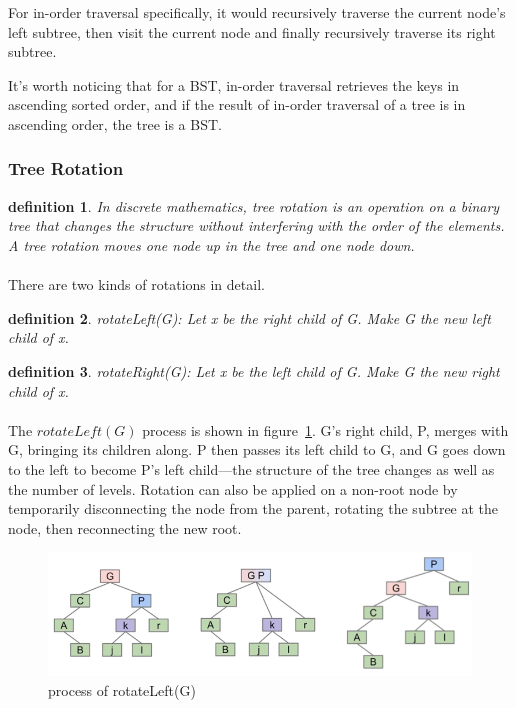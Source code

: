 \documentclass{article}
\newtheorem{definition}{definition}[section]
\begin{document}
For in-order traversal specifically, it would recursively traverse the current node's left subtree, then visit the current node and finally recursively traverse its right subtree.

It's worth noticing that for a BST, in-order traversal retrieves the keys in ascending sorted order, and if the result of in-order traversal of a tree is in ascending order, the tree is a BST.

\subsubsection{Tree Rotation}\label{rotation}

\begin{definition}
    In discrete mathematics, tree rotation is an operation on a binary tree that changes the structure without interfering with the order of the elements. A tree rotation moves one node up in the tree and one node down.
\end{definition}

\paragraph{}
There are two kinds of rotations in detail.

\begin{definition}
    rotateLeft(G): Let x be the right child of G. Make G the new left child of x.
\end{definition}

\begin{definition}
    rotateRight(G): Let x be the left child of G. Make G the new right child of x.
\end{definition}

\paragraph{}
The $rotateLeft(G)$ process is shown in figure~\ref{rotation_process}. G's right child, P, merges with G, bringing its children along. P then passes its left child to G, and G goes down to the left to become P's left child—the structure of the tree changes as well as the number of levels. Rotation can also be applied on a non-root node by temporarily disconnecting the node from the parent, rotating the subtree at the node, then reconnecting the new root.

\begin{figure}[htbp]
    \centering
	\includegraphics[width = \textwidth]{rotation.png}
	\caption{process of rotateLeft(G)}
	\label{rotation_process}
\end{figure}
\end{document}
